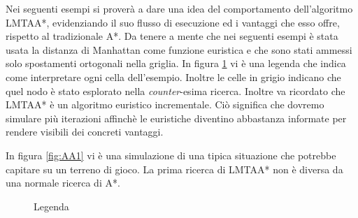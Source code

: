 \documentclass[12pt]{book}
\begin{document}
\par{ Nei seguenti esempi si prover\`a a dare una idea del comportamento dell'algoritmo LMTAA*, evidenziando il suo flusso di esecuzione ed i vantaggi che esso offre, rispetto al tradizionale A*. Da tenere a mente che nei seguenti esempi \`e stata usata la distanza di Manhattan come funzione euristica e che sono stati ammessi solo spostamenti ortogonali nella griglia. In figura \ref{fig:legenda} vi \`e una legenda che indica come interpretare ogni cella dell'esempio. Inoltre le celle in grigio indicano che quel nodo \`e stato esplorato nella \emph{counter}-esima ricerca. Inoltre va ricordato che LMTAA* \`e un algoritmo euristico incrementale. Ci\`o significa che dovremo simulare pi\`u iterazioni affinch\`e le euristiche diventino abbastanza informate per rendere visibili dei concreti vantaggi.
}\par{In figura \ref{fig:AA1} vi \`e una simulazione di una tipica situazione che potrebbe capitare su un terreno di gioco. La prima ricerca di LMTAA* non \`e diversa da una normale ricerca di A*.} 
\begin{figure}[h]
\centering
{}
\caption{Legenda}
\label{fig:legenda}
\end{figure}
\end{document}
